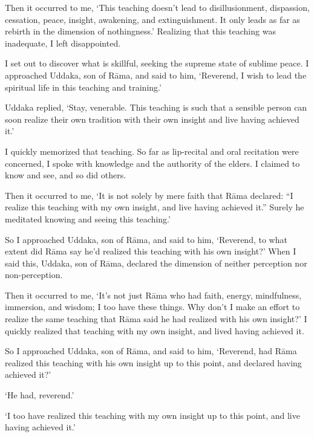 \documentclass[12pt,openany]{book}%
\begin{document}
Then it occurred to me, ‘This teaching doesn’t lead to disillusionment, dispassion, cessation, peace, insight, awakening, and extinguishment. It only leads as far as rebirth in the dimension of nothingness.’ Realizing that this teaching was inadequate, I left disappointed. 

I set out to discover what is skillful, seeking the supreme state of sublime peace. I approached Uddaka, son of \textsanskrit{Rāma}, and said to him, ‘Reverend, I wish to lead the spiritual life in this teaching and training.’ 

Uddaka replied, ‘Stay, venerable. This teaching is such that a sensible person can soon realize their own tradition with their own insight and live having achieved it.’ 

I quickly memorized that teaching. So far as lip-recital and oral recitation were concerned, I spoke with knowledge and the authority of the elders. I claimed to know and see, and so did others. 

Then it occurred to me, ‘It is not solely by mere faith that \textsanskrit{Rāma} declared: “I realize this teaching with my own insight, and live having achieved it.” Surely he meditated knowing and seeing this teaching.’ 

So I approached Uddaka, son of \textsanskrit{Rāma}, and said to him, ‘Reverend, to what extent did \textsanskrit{Rāma} say he’d realized this teaching with his own insight?’ When I said this, Uddaka, son of \textsanskrit{Rāma}, declared the dimension of neither perception nor non-perception. 

Then it occurred to me, ‘It’s not just \textsanskrit{Rāma} who had faith, energy, mindfulness, immersion, and wisdom; I too have these things. Why don’t I make an effort to realize the same teaching that \textsanskrit{Rāma} said he had realized with his own insight?’ I quickly realized that teaching with my own insight, and lived having achieved it. 

So I approached Uddaka, son of \textsanskrit{Rāma}, and said to him, ‘Reverend, had \textsanskrit{Rāma} realized this teaching with his own insight up to this point, and declared having achieved it?’ 

‘He had, reverend.’ 

‘I too have realized this teaching with my own insight up to this point, and live having achieved it.’ 
\end{document}
